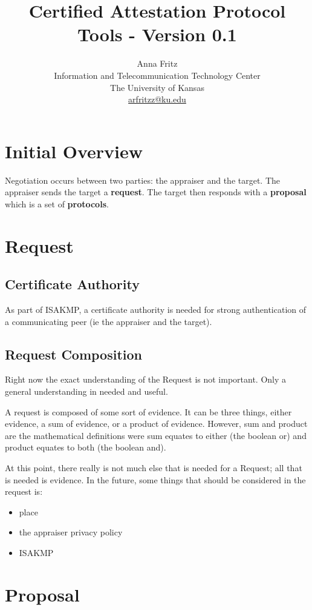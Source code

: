 \documentclass[10pt]{article}
\title{Certified Attestation Protocol Tools - Version 0.1}
\author{Anna Fritz \\
  Information and Telecommunication Technology Center \\
  The University of Kansas \\
  \url{arfritzz@ku.edu}
}
\newcommand{\squash}{\itemsep=0pt\parskip=0pt}
\begin{document}
\section {Initial Overview}

  Negotiation occurs between two parties: the appraiser and the target. 
  The appraiser sends the target a \textbf{request}. The target then responds
  with a \textbf{proposal} which is a set of \textbf{protocols}.

\section {Request}

\subsection {Certificate Authority}
  
  As part of ISAKMP, a certificate authority is needed for strong 
  authentication of a communicating peer (ie the appraiser and the
  target). 

\subsection {Request Composition}
  
  Right now the exact understanding of the Request is not important.
  Only a general understanding in needed and useful. 
  
  A request is composed of some sort of evidence. It can be three things, either evidence, a sum of evidence, or a product of evidence. However, sum and product are the mathematical definitions were sum equates to either (the boolean or) and product equates to both (the boolean and). 
  
  At this point, there really is not much else that is needed for a Request; all that is needed is evidence. In the future, some things that should be considered in the request is:
  
  \begin{itemize}
   \squash
   \item place
   \item the appraiser privacy policy
   \item ISAKMP
  \end{itemize}

\section {Proposal}
\end{document}
